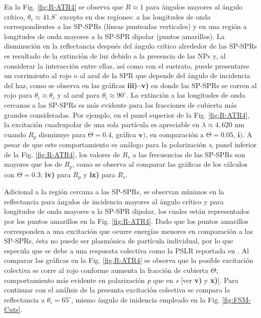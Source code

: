 En la Fig.  \ref{fig:R-ATR4} se observa que $R\approx 1$ para ángulos mayores al ángulo crítico, $\theta_c \approx 41.8^\circ $ excepto en dos regiones: a las longitudes de onda correspondientes a las SP-SPRs (líneas punteadas verticales) y en una región a longitudes de onda mayores a la SP-SPR dipolar (puntos amarillos). La disminución en la reflectancia después del ángulo crítico alrededor de las SP-SPRs es resultado de la extinción de luz debido a la presencia de las NPs y, al considerar la interacción entre ellas, así como con el sustrato, puede presentarse un corrimiento al rojo o al azul de la SPR que depende del ángulo de incidencia del haz, como se observa en las gráficas \textbf{iii)--v)} en donde las SP-SPRs se corren al rojo para $\theta_i\approx \theta_c$ y al azul para $\theta_i\approx 90^\circ$. La extinción a las longitudes de onda cercanas a las SP-SPRs es más evidente para las fracciones de cubierta más grandes consideradas. Por ejemplo, en el panel superior de la Fig. \ref{fig:R-ATR4},  la excitación cuadrupolar de una sola partícula es apreciable en $\lambda \approx 4,620$ nm cuando $R_p$ disminuye para $\Theta = 0.4$, gráfica  $\mathbf{v)}$, en comparación a $\Theta = 0.05$, $\mathbf{i)}$. A pesar de que este comportamiento es análogo para la polarización \emph{s}, panel inferior de la  Fig. \ref{fig:R-ATR4}, los valores de $R_s$ a las frecuencias de las SP-SPRs son mayores que los de $R_p$, como se observa al comparar las gráficas de los cálculos con $\Theta=0.3$: \textbf{iv)} para $R_p$ y \textbf{ix)} para $R_s$.

Adicional a la región cercana a las SP-SPRs, se observan mínimos en la reflectancia para ángulos de incidencia mayores al ángulo crítico y para longitudes de onda mayores a la SP-SPR dipolar, los cuales están  representados por los puntos amarillos en la Fig. \ref{fig:R-ATR4}. Dado que los puntos amarillos corresponden a una excitación que ocurre energías  menores en comparación a las SP-SPRs, ésta no puede ser plasmónica de partícula individual,  por lo que especula que se debe a una respuesta colectiva como la PSLR reportada en \cite{danilov2018ultra}. Al comparar las gráficas en la  Fig.  \ref{fig:R-ATR4} se observa que la posible excitación colectiva se corre al rojo  conforme aumenta la fracción de cubierta $\Theta$; comportamiento más evidente en polarización \emph{p} que en \emph{s} [ver \textbf{v)} y \textbf{x)}]. Para continuar con el análisis de la presunta excitación colectiva se compara la reflectancia a $\theta_i = 65^\circ$, mismo ángulo de inidencia empleado en la Fig. \ref{fig:FSM-Cuts}.
    
